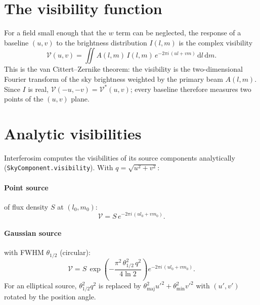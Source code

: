 
\label{ch:visibility}
\section{The visibility function}

For a field small enough that the $w$ term can be neglected, the
response of a baseline $(u,v)$ to the brightness distribution $I(l,m)$
is the complex visibility
\begin{equation}
  \mathcal V(u,v) = \iint A(l,m)\,I(l,m)\,
     e^{-2\pi i\,(ul+vm)}\,\mathrm{d}l\,\mathrm{d}m .
  \label{eq:vis}
\end{equation}
This is the van Cittert--Zernike theorem: the visibility is the
two-dimensional Fourier transform of the sky brightness weighted by
the primary beam $A(l,m)$. Since $I$ is real,
$\mathcal V(-u,-v) = \mathcal V^*(u,v)$; every baseline therefore
measures two points of the $(u,v)$ plane.

\section{Analytic visibilities}

Interferosim computes the visibilities of its source components
analytically (\texttt{SkyComponent.visibility}). With $q=\sqrt{u^2+v^2}$:

\paragraph*{Point source} of flux density $S$ at $(l_0,m_0)$:
\begin{equation}
  \mathcal V = S\,e^{-2\pi i\,(ul_0+vm_0)} .
\end{equation}

\paragraph*{Gaussian source} with FWHM $\theta_{1/2}$ (circular):
\begin{equation}
  \mathcal V = S\,\exp\!\left(-\frac{\pi^2\,\theta_{1/2}^2\,q^2}{4\ln 2}\right)
  e^{-2\pi i\,(ul_0+vm_0)} .
\end{equation}
For an elliptical source, $\theta_{1/2}^2 q^2$ is replaced by
$\theta_{\mathrm{maj}}^2 u'^2 + \theta_{\mathrm{min}}^2 v'^2$ with
$(u',v')$ rotated by the position angle.

